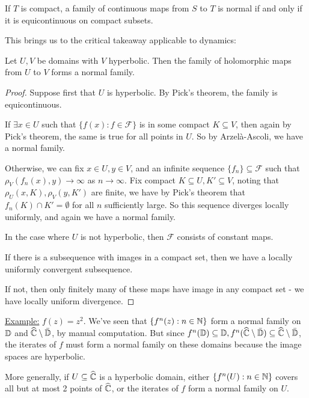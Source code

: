 \documentclass[10pt,a4paper]{article}
\begin{document}
\addtocounter{theorem}{-1}
\begin{corollary}
  If $T$ is compact, a family of continuous maps from $S$ to $T$ is normal if and only if it is equicontinuous on compact subsets.
\end{corollary}

This brings us to the critical takeaway applicable to dynamics:
\begin{theorem}
  Let $U, V$ be domains with $V$ hyperbolic. Then the family of holomorphic maps from $U$ to $V$ forms a normal family.
\end{theorem}
\begin{proof}
  Suppose first that $U$ is hyperbolic. By Pick's theorem, the family is equicontinuous.

  If $\exists x \in U$ such that $\{f(x) : f \in \mathcal{F}\}$ is in some compact $K \subseteq V$, then again by Pick's theorem, the same is true for all points in $U$. So by Arzel\`a-Ascoli, we have a normal family.

  Otherwise, we can fix $x \in U, y \in V$, and an infinite sequence $\{f_n\}\subseteq \mathcal{F}$ such that $\rho_V(f_n(x), y) \to \infty$ as $n \to \infty$. Fix compact $K \subseteq U, K'\subseteq V$, noting that $\rho_U(x, K), \rho_V(y, K')$ are finite, we have by Pick's theorem that $f_n(K) \cap K' = \emptyset$ for all $n$ sufficiently large. So this sequence diverges locally uniformly, and again we have a normal family.

  In the case where $U$ is not hyperbolic, then $\mathcal{F}$ consists of constant maps.

  If there is a subsequence with images in a compact set, then we have a locally uniformly convergent subsequence.

  If not, then only finitely many of these maps have image in any compact set - we have locally uniform divergence.
\end{proof}

\underline{Example:} $f(z) = z^2$. We've seen that $\{f^n(z) : n \in \mathbb{N}\}$ form a normal family on $\mathbb{D}$ and $\widehat{\mathbb{C}}\setminus\bar{\mathbb{D}}$, by manual computation. But since $f^n(\mathbb{D}) \subseteq \mathbb{D}, f^n(\widehat{\mathbb{C}}\setminus\bar{\mathbb{D}})\subseteq\widehat{\mathbb{C}}\setminus\bar{\mathbb{D}}$, the iterates of $f$ must form a normal family on these domains because the image spaces are hyperbolic.

More generally, if $U \subseteq \widehat{\mathbb{C}}$ is a hyperbolic domain, either $\{f^n(U) : n \in \mathbb{N}\}$ covers all but at most 2 points of $\widehat{\mathbb{C}}$, or the iterates of $f$ form a normal family on $U$.
\end{document}
